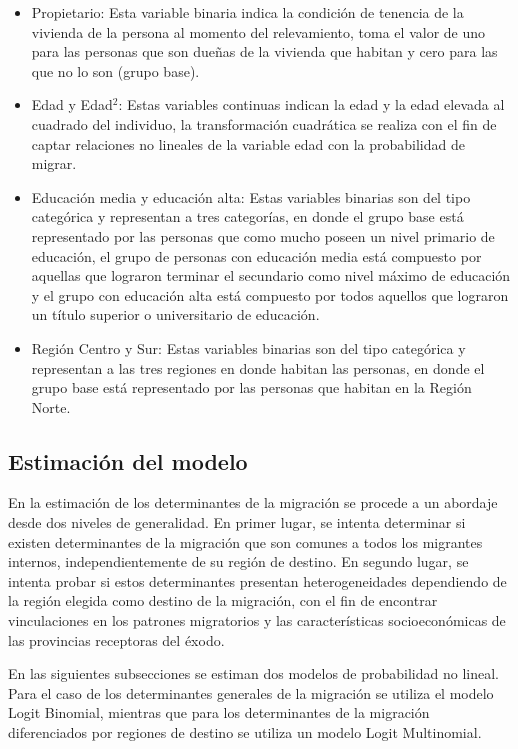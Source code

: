 \documentclass[12pt,a4paper]{article}
\begin{document}
\begin{itemize}
\item Propietario: Esta variable binaria indica la condición de tenencia de la vivienda de la persona al momento del relevamiento, toma el valor de uno para las personas que son dueñas de la vivienda que habitan y cero para las que no lo son (grupo base).
\item Edad y Edad$^{2}$: Estas variables continuas indican la edad  y la edad elevada al cuadrado del individuo, la transformación cuadrática se realiza con el fin de captar relaciones no lineales de la variable edad con la probabilidad de migrar. 
\item Educación media y educación alta: Estas variables binarias son del tipo categórica y representan a tres categorías, en donde el grupo base está representado por las personas que como mucho poseen un nivel primario de educación, el grupo de personas con educación media está compuesto por aquellas que lograron terminar el secundario como nivel máximo de educación y el grupo con educación alta está compuesto por todos aquellos que lograron un título superior o universitario de educación.
\item Región Centro y Sur: Estas variables binarias son del tipo categórica y representan a las tres regiones en donde habitan las personas, en donde el grupo base está representado por las personas que habitan en la Región Norte.
\end{itemize}

\subsection{Estimación del modelo}
En la estimación de los determinantes de la migración se procede a un abordaje desde dos niveles de generalidad. En primer lugar, se intenta determinar si existen determinantes de la migración que son comunes a todos los migrantes internos, independientemente de su región de destino. En segundo lugar, se intenta probar si estos determinantes presentan heterogeneidades dependiendo de la región elegida como destino de la migración, con el fin de encontrar vinculaciones en los patrones migratorios y las características socioeconómicas de las provincias receptoras del éxodo.

En las siguientes subsecciones se estiman dos modelos de probabilidad no lineal. Para el caso de los determinantes generales de la migración se utiliza el modelo Logit Binomial, mientras que para los determinantes de la migración diferenciados por regiones de destino se utiliza un modelo Logit Multinomial.
\end{document}
